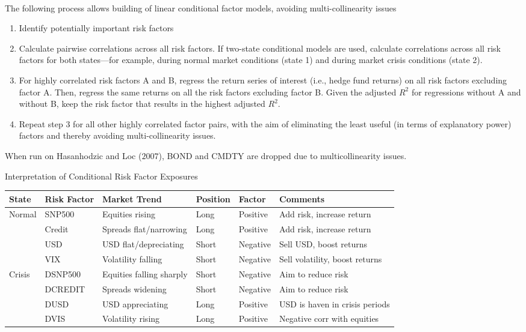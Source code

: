 \begin{method} \\
The following process allows building of linear conditional factor models, avoiding multi-collinearity issues
\begin{enumerate}[label=\arabic*.]
\setlength{\itemsep}{0pt}
\item Identify potentially important risk factors
\item Calculate pairwise correlations across all risk factors. If two-state conditional models are used, calculate correlations across all risk factors for both states—for example, during normal market conditions (state 1) and during market crisis conditions (state 2). 
\item For highly correlated risk factors A and B, regress the return series of interest (i.e., hedge fund returns) on all risk factors excluding factor A. Then, regress the same returns on all the risk factors excluding factor B. Given the adjusted $R^2$ for regressions without A and without B, keep the risk factor that results in the highest adjusted $R^2$.
\item Repeat step 3 for all other highly correlated factor pairs, with the aim of eliminating the least useful (in terms of explanatory power) factors and thereby avoiding multi-collinearity issues.
\end{enumerate}
When run on Hasanhodzic and Loc ($2007$), BOND and CMDTY are dropped due to multicollinearity issues.
\end{method}

\begin{flushleft}
Interpretation of Conditional Risk Factor Exposures
\begin{tabularx}{\textwidth}{p{4em}|p{5em}|p{11em}|p{4em}|p{4em}|X}
\hline
\rowcolor{gray!30}
State & Risk Factor & Market Trend & Position & Factor & Comments \\
\hline
Normal & SNP500 & Equities rising & Long & Positive & Add risk, increase return \\
& Credit & Spreads flat/narrowing & Long & Positive & Add risk, increase return \\
& USD & USD flat/depreciating & Short & Negative & Sell USD, boost returns \\
& VIX & Volatility falling & Short & Negative & Sell volatility, boost returns \\
\hline
Crisis & DSNP500 & Equities falling sharply & Short & Negative & Aim to reduce risk \\
& DCREDIT & Spreads widening & Short & Negative & Aim to reduce risk \\
& DUSD & USD appreciating & Long & Positive & USD is haven in crisis periods \\
& DVIS & Volatility rising & Long & Positive & Negative corr with equities \\
\hline
\end{tabularx}
\end{flushleft}

